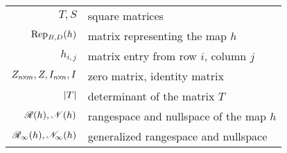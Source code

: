 \begin{center}
\begin{tabular}{r|l}
    \( T,S \)              &square matrices                           \\
    \( \rep{h}{B,D} \)     &matrix representing the map \( h \)       \\
    \( h_{i,j} \)          &matrix entry from row \( i \),
                              column \( j \)                      \\
    \( Z_{\nbym{n}{m}},Z,I_{\nbyn{n}},I \)        &zero matrix, identity matrix    \\
    \( \deter{T} \)        &determinant of the matrix \( T \)         \\
    \( \rangespace{h},\nullspace{h} \)
                           &rangespace and nullspace of the map \( h \) \\
    \( \genrangespace{h},\gennullspace{h} \)
                           &generalized rangespace and nullspace
  \end{tabular}
\end{center}\vfill
